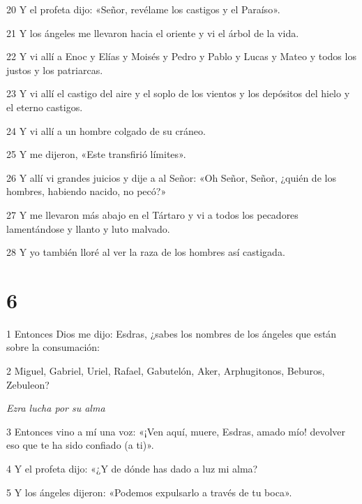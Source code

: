 \par 20 Y el profeta dijo: «Señor, revélame los castigos y el Paraíso».

\par 21 Y los ángeles me llevaron hacia el oriente y vi el árbol de la vida.

\par 22 Y vi allí a Enoc y Elías y Moisés y Pedro y Pablo y Lucas y Mateo y todos los justos y los patriarcas.

\par 23 Y vi allí el castigo del aire y el soplo de los vientos y los depósitos del hielo y el eterno castigos.

\par 24 Y vi allí a un hombre colgado de su cráneo. 

\par 25 Y me dijeron, «Este transfirió límites».

\par 26 Y allí vi grandes juicios y dije a al Señor: «Oh Señor, Señor, ¿quién de los hombres, habiendo nacido, no pecó?»

\par 27 Y me llevaron más abajo en el Tártaro y vi a todos los pecadores lamentándose y llanto y luto malvado.

\par 28 Y yo también lloré al ver la raza de los hombres así castigada.

\chapter{6}

\par 1 Entonces Dios me dijo: Esdras, ¿sabes los nombres de los ángeles que están sobre la consumación:

\par 2 Miguel, Gabriel, Uriel, Rafael, Gabutelón, Aker, Arphugitonos, Beburos, Zebuleon?

\par \textit{Ezra lucha por su alma}

\par 3 Entonces vino a mí una voz: «¡Ven aquí, muere, Esdras, amado mío! devolver eso que te ha sido confiado (a ti)».

\par 4 Y el profeta dijo: «¿Y de dónde has dado a luz mi alma?

\par 5 Y los ángeles dijeron: «Podemos expulsarlo a través de tu boca».

